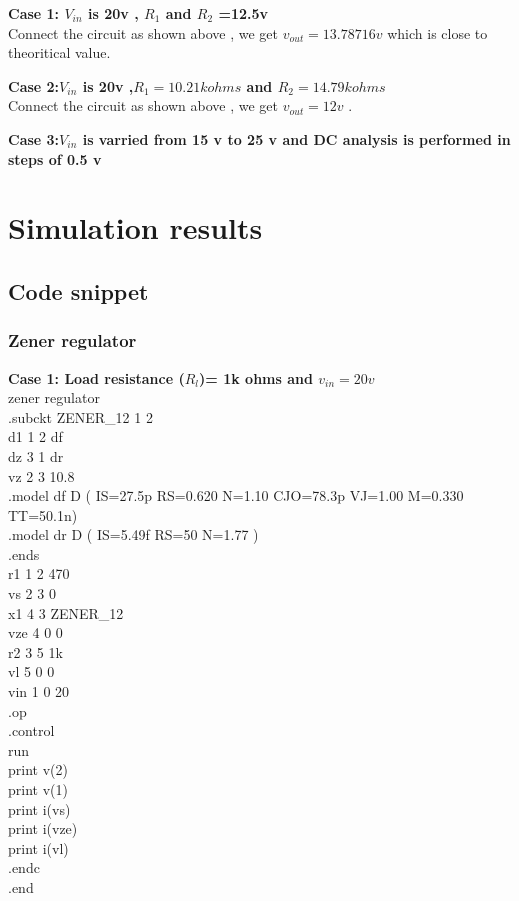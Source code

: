 \documentclass[12pt]{article}
\begin{document}
\textbf{Case 1: \(V_{in}\) is 20v , \(R_{1}\) and \(R_{2}\) =12.5v\\}
Connect the circuit as shown above , we get \(v_{out} = 13.78716v\) which is close to theoritical value.

 \textbf{Case 2:\(V_{in}\) is 20v ,\(R_{1}=10.21 k ohms\) and \(R_{2}=14.79 k ohms\)\\}
Connect the circuit as shown above , we get \(v_{out} = 12v\) .

\textbf{Case 3:\(V_{in}\) is varried from 15 v to 25 v and DC analysis is performed in steps of 0.5 v \\}
\newpage
 
 
 
 


 
 
 
 
\section{Simulation results}%
\subsection{Code snippet}

\subsubsection{Zener regulator}
\textbf{Case 1: Load resistance (\(R_{l}\))= 1k ohms and \(v_{in}=20v\)\\}
zener regulator\\
.subckt ZENER\_12 1 2\\
d1 1 2 df\\
dz 3 1 dr\\
vz 2 3 10.8\\
.model df D ( IS=27.5p RS=0.620 N=1.10 CJO=78.3p VJ=1.00 M=0.330 TT=50.1n)\\
.model dr D ( IS=5.49f RS=50 N=1.77 )\\
.ends\\
r1  1 2 470\\
vs 2 3 0\\
x1 4 3 ZENER\_12\\
vze 4 0 0\\
r2 3 5 1k\\
vl 5 0 0\\
vin 1 0 20\\
.op\\
.control\\
run\\
print v(2)\\
print v(1)\\
print i(vs)\\
print i(vze)\\
print i(vl)\\
.endc\\
.end\\
\end{document}
